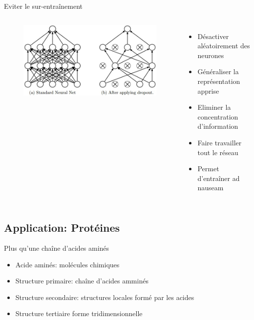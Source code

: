 \documentclass{beamer}
\begin{document}
\begin{frame}{Eviter le sur-entraînement}

  \begin{columns}
    \begin{figure}
      \centering
      \includegraphics[scale=0.3]{../Figures/dropout}
    \end{figure}

    \begin{itemize}
    \item Désactiver aléatoirement des neurones\pause
    \item Généraliser la représentation apprise\pause
    \item Eliminer la concentration d'information\pause
    \item Faire travailler tout le réseau\pause
    \item Permet d'entraîner ad nauseam
    \end{itemize}
  \end{columns}
\end{frame}

\subsection{Application: Protéines}

\begin{frame}{Plus qu'une chaîne d'acides aminés}

    \begin{itemize}
    \item Acide aminés: molécules chimiques
    \item Structure primaire: chaîne d'acides amminés\pause
    \item Structure secondaire: structures locales formé par les acides\pause
    \item Structure tertiaire forme tridimensionnelle \pause
    \end{itemize}
\end{frame}
\end{document}
